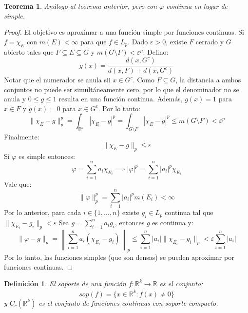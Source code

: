 \documentclass[12pt,a4paper]{article}
\theoremstyle{profesional}
\newtheorem{teorema}{Teorema}[section]
\theoremstyle{definicion-style}
\newtheorem{definicion}{Definición}[section]
\newcommand{\R}{\mathbb{R}}
\begin{document}
\begin{teorema}
    Análogo al teorema anterior, pero con \( \varphi \) continua en lugar de simple.
\end{teorema}
\begin{proof}
    El objetivo es aproximar a una función simple por funciones continuas. Si \( f = \chi_{E} \) con \( m(E) < \infty \) para que \( f \in L_p \).
    Dado \( \varepsilon > 0 \), existe \( F \) cerrado y \( G \) abierto tales que \( F \subseteq E \subseteq G \) y
    \( m(G \setminus F) < \varepsilon^p \).
    Defino: \[
        g(x) = \dfrac{d(x, G^c)}{d(x, F) + d(x, G^c)}
    \]
    Notar que el numerador se anula sii \( x \in G^c \). Como \( F \subseteq G \), la distancia a ambos conjuntos no puede ser simultáneamente cero, por lo que el denominador no se anula y \( 0 \leq g \leq 1 \) resulta en una función continua.
    Además, \( g(x) = 1 \) para \( x \in F \) y \( g(x) = 0 \) para \( x \in G^c \). Por lo tanto: \[
        \| \chi_E - g \|_p^p = \int_{\R^n} |\chi_E - g|^p = \int_{G \setminus F} |\chi_E - g|^p \leq m(G \setminus F) < \varepsilon^p
    \]
    Finalmente: \[
        \| \chi_E - g \|_p \leq \varepsilon
    \]
    Si \( \varphi \) es simple entonces: \[
        \varphi = \sum_{i=1}^n a_i \chi_{E_i} \implies |\varphi|^p = \sum_{i=1}^n |a_i|^p \chi_{E_i}
    \]
    Vale que: \[
        \| \varphi \|_p^p = \sum_{i=1}^n |a_i|^p m(E_i) < \infty
    \]
    Por lo anterior, para cada \( i \in \{ 1, \ldots, n \} \) existe \( g_i \in L_p \) continua tal que \( \| \chi_{E_i} - g_i \|_p < \varepsilon \)
    Sea \( g = \sum_{i=1}^n a_i g_i \), entonces \( g \) es continua y: \[
        \| \varphi - g \|_p = \left \| \sum_{i=1}^n a_i (\chi_{E_i} - g_i) \right \|_p \leq \sum_{i=1}^n |a_i| \| \chi_{E_i} - g_i \|_p < \varepsilon \sum_{i=1}^n |a_i|
    \]
    Por lo tanto, las funciones simples (que son densas) se pueden aproximar por funciones continuas.
\end{proof}

\begin{definicion}
    El soporte de una función \( f : \R^k \to \R \) es el conjunto: \[
        sop(f) = \overline{\{ x \in \R^k : f(x) \neq 0 \}}
    \]
    y \( C_c(\R^k) \) es el conjunto de funciones continuas con soporte compacto.
\end{definicion}
\end{document}
